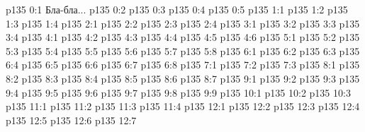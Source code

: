 \author{Промежуточные создания}
\vs p135 0:1  Бла-бла...
\vs p135 0:2 
\vs p135 0:3 
\vs p135 0:4 
\vs p135 0:5 
\vs p135 1:1 
\vs p135 1:2 
\vs p135 1:3 \pc 
\vs p135 1:4 
\vs p135 2:1 
\vs p135 2:2 \pc 
\vs p135 2:3 
\vs p135 2:4 
\vs p135 3:1 
\vs p135 3:2 \pc 
\vs p135 3:3 \pc 
\vs p135 3:4 
\vs p135 4:1 
\vs p135 4:2 
\vs p135 4:3 
\vs p135 4:4 
\vs p135 4:5 
\vs p135 4:6 
\vs p135 5:1 
\vs p135 5:2 
\vs p135 5:3 
\vs p135 5:4 
\vs p135 5:5 
\vs p135 5:6 
\vs p135 5:7 
\vs p135 5:8 
\vs p135 6:1 
\vs p135 6:2 
\vs p135 6:3 
\vs p135 6:4 
\vs p135 6:5 
\vs p135 6:6 
\vs p135 6:7 
\vs p135 6:8 
\vs p135 7:1 
\vs p135 7:2 \pc 
\vs p135 7:3 
\vs p135 8:1 
\vs p135 8:2 
\vs p135 8:3 
\vs p135 8:4 \pc 
\vs p135 8:5 
\vs p135 8:6 \pc 
\vs p135 8:7 
\vs p135 9:1 
\vs p135 9:2 \pc 
\vs p135 9:3 
\vs p135 9:4 
\vs p135 9:5 
\vs p135 9:6 
\vs p135 9:7 \pc 
\vs p135 9:8 
\vs p135 9:9 \pc 
{}
\vs p135 10:1 
\vs p135 10:2 
\vs p135 10:3 
\vs p135 11:1 
\vs p135 11:2 \pc 
\vs p135 11:3 \pc 
\vs p135 11:4 \pc 
{}
\vs p135 12:1 
\vs p135 12:2 
\vs p135 12:3 
\vs p135 12:4 
\vs p135 12:5 \pc 
\vs p135 12:6 
\vs p135 12:7 
\quizlink

